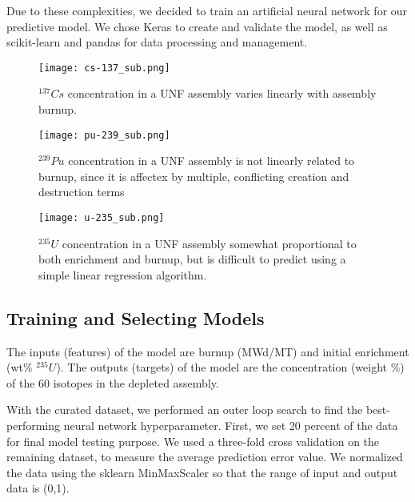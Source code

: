 Due to these complexities, we decided to train an artificial
neural network for our predictive model. We chose
Keras \cite{collet_keras_2015} to create and validate the model,
as well as scikit-learn \cite{pedregosa_scikit-learn_2011}
and pandas \cite{mckinney-proc-scipy-2010} for data processing and management.

\begin{figure}
    \centering
    \texttt{[image: cs-137\_sub.png]}
    \caption{$^{137}Cs$ concentration in a \gls{UNF} assembly
             varies linearly with assembly burnup.}
    \label{fig:cs_137}
\end{figure}

\begin{figure}
    \centering
    \texttt{[image: pu-239\_sub.png]}
    \caption{$^{239}Pu$ concentration in a \gls{UNF} assembly
             is not linearly related to burnup, since it
             is affectex by multiple, conflicting creation
             and destruction terms}
    \label{fig:pu_239}
\end{figure}


\begin{figure}
    \centering
    \texttt{[image: u-235\_sub.png]}
    \caption{$^{235}U$ concentration in a \gls{UNF} assembly
             somewhat proportional to both enrichment and
             burnup, but is difficult to predict using
             a simple linear regression algorithm.}
    \label{fig:u_235}
\end{figure}


\subsection{Training and Selecting Models}

The inputs (features) of the model are
burnup (MWd/MT) and initial enrichment (wt\% $^{235}U$).
The outputs (targets) of the model are
the concentration (weight \%) of the 60 isotopes in the
depleted assembly.

With the curated dataset, we performed an outer loop
search to find the best-performing neural network
hyperparameter. First, we set 20 percent of the 
data for final model testing purpose. We used a three-fold
cross validation \cite{stone1974cross} on the remaining
dataset, to
measure the average prediction error value. We
normalized the data using the sklearn MinMaxScaler
so that the range of input and output data is (0,1).

